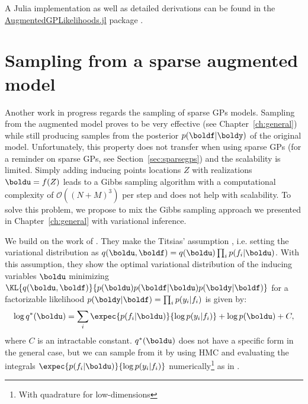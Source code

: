 A Julia implementation as well as detailed derivations can be found in the \href{https://github.com/JuliaGaussianProcesses/AugmentedGPLikelihoods.jl}{AugmentedGPLikelihoods.jl} package \cite{theo_galy_fajou_2022_6347022}.

\section{Sampling from a sparse augmented model}

Another work in progress regards the sampling of sparse \ac{GPs} models.
Sampling from the augmented model proves to be very effective (see Chapter~\ref{ch:general}) while still producing samples from the posterior $p(\boldf|\boldy)$ of the original model.
Unfortunately, this property does not transfer when using sparse \ac{GPs} (for a reminder on sparse \ac{GPs}, see Section~\ref{sec:sparsegps}) and the scalability is limited.
Simply adding inducing points locations $Z$ with realizations $\boldu = f(Z)$ leads to a Gibbs sampling algorithm with a computational complexity of $\mathcal{O}((N+M)^3)$ per step and does not help with scalability.
To solve this problem, we propose to mix the Gibbs sampling approach we presented in Chapter~\ref{ch:general} with variational inference.

We build on the work of \citet{hensmanMCMCVariationallySparse2015}. 
They make the Titsias' assumption \cite{Titsias2009}, i.e. setting the variational distribution as $q(\boldu,\boldf) = q(\boldu)\prod_i p(f_i|\boldu)$.
With this assumption, they show the optimal variational distribution of the inducing variables $\boldu$ minimizing $\KL{q(\boldu, \boldf)}{p(\boldu)p(\boldf|\boldu)p(\boldy|\boldf)}$ for a factorizable likelihood $p(\boldy|\boldf)=\prod_i p(y_i|f_i)$ is given by:
\begin{align}
    \log q^*(\boldu) = \sum_{i}\expec{p(f_i|\boldu)}{\log p(y_i|f_i)} + \log p(\boldu) + C,\label{eq:obj_hensman}
\end{align}
where $C$ is an intractable constant.
$q^*(\boldu)$ does not have a specific form in the general case, but we can sample from it by using \ac{HMC} and evaluating the integrals $\expec{p(f_i|\boldu)}{\log p(y_i|f_i)}$ numerically\footnote{With quadrature for low-dimensions} as in \cite{hensmanMCMCVariationallySparse2015}.

